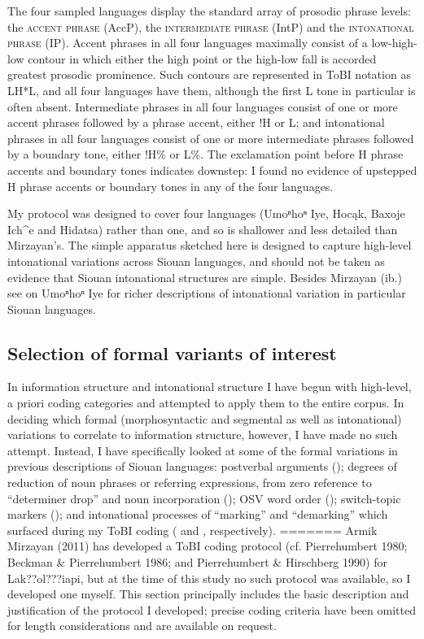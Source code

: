 \documentclass[output=paper]{LSP/langsci}
\begin{document}
The four sampled languages display the standard array of prosodic phrase levels: the \textsc{accent phrase} (AccP), the \textsc{intermediate phrase} (IntP) and the \textsc{intonational phrase} (IP). Accent phrases in all four languages maximally consist of a low-high-low contour in which either the high point or the high-low fall is accorded greatest prosodic prominence. Such contours are represented in ToBI notation as LH*L, and all four languages have them, although the first L tone in particular is often absent. Intermediate phrases in all four languages consist of one or more accent phrases followed by a phrase accent, either !H or L; and intonational phrases in all four languages consist of one or more intermediate phrases followed by a boundary tone, either !H\% or L\%. The exclamation point before H phrase accents and boundary tones indicates downstep: I found no evidence of upstepped H phrase accents or boundary tones in any of the four languages. 

My protocol was designed to cover four languages (Umoⁿhoⁿ Iye, Hocąk, Baxoje Ich\^{}e and Hidatsa) rather than one, and so is shallower and less detailed than Mirzayan’s. The simple apparatus sketched here is designed to capture high-level intonational variations across Siouan languages, and should not be taken as evidence that Siouan intonational structures are simple. Besides Mirzayan (ib.) see \citet{Larson2009} on Umoⁿhoⁿ Iye for richer descriptions of intonational variation in particular Siouan languages. 

\subsection{Selection of formal variants of interest}\label{variantselection}

In information structure and intonational structure I have begun with high-level, a priori coding categories and attempted to apply them to the entire corpus. In deciding which formal (morphosyntactic and segmental as well as intonational) variations to correlate to information structure, however, I have made no such attempt. Instead, I have specifically looked at some of the formal variations in previous descriptions of Siouan languages: postverbal arguments (); degrees of reduction of noun phrases or referring expressions, from zero reference to “determiner drop” and noun incorporation (); OSV word order (); switch-topic markers (); and intonational processes of “marking” and “demarking” which surfaced during my ToBI coding ( and , respectively).
=======
Armik Mirzayan (2011) has developed a ToBI coding protocol (cf. Pierrehumbert 1980; Beckman \& Pierrehumbert 1986; and Pierrehumbert \& Hirschberg 1990) for Lak??ol???iapi, but at the time of this study no such protocol was available, so I developed one myself. This section principally includes the basic description and justification of the protocol I developed; precise coding criteria have been omitted for length considerations and are available on request. 
\end{document}
